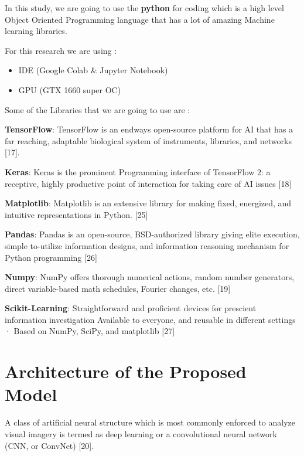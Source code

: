 \noindent In this study, we are going to use the \textbf{python} for coding which is a high level Object Oriented Programming language that has a lot of amazing Machine learning libraries.

\vspace{5mm}
\noindent For this research we are using :

\begin{itemize}
    \item IDE (Google Colab & Jupyter Notebook)
    \item GPU (GTX 1660 super OC)
\end{itemize}

\newpage
\noindent Some of the Libraries that we are going to use are :

\vspace{5mm}
\noindent \textbf{TensorFlow}: TensorFlow is an endways open-source platform for AI that has a far reaching, adaptable biological system of instruments, libraries, and networks [17].

\vspace{5mm}
\noindent \textbf{Keras}: Keras is the prominent Programming interface of TensorFlow 2: a receptive, highly productive point of interaction for taking care of AI issues [18]

\vspace{5mm}
\noindent \textbf{Matplotlib}: Matplotlib is an extensive library for making fixed, energized, and intuitive representations in Python. [25]

\vspace{5mm}
\noindent \textbf{Pandas}: Pandas is an open-source, BSD-authorized library giving elite execution, simple to-utilize information designs, and information reasoning mechanism for Python programming [26]

\vspace{5mm}
\noindent \textbf{Numpy}: NumPy offers thorough numerical actions, random number generators, direct variable-based math schedules, Fourier changes, etc. [19]

\vspace{5mm}
\noindent \textbf{Scikit-Learning}: Straightforward and proficient devices for prescient information investigation Available to everyone, and reusable in different settings · Based on NumPy, SciPy, and matplotlib [27]

\section{Architecture of the Proposed Model}
A class of artificial neural structure which is most commonly enforced to analyze visual imagery is termed as deep learning or a convolutional neural network (CNN, or ConvNet) [20].

